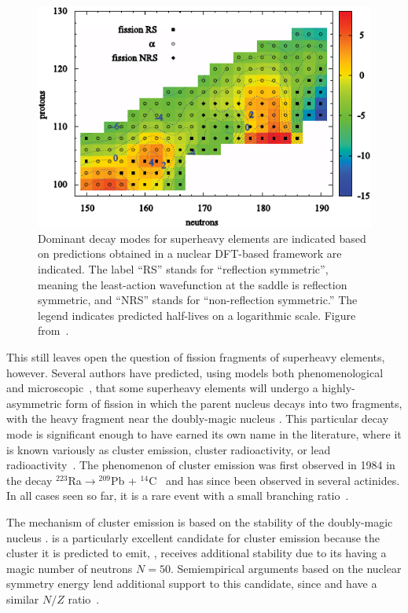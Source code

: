 \begin{figure}
	\centering
	\includegraphics[width=0.7\linewidth]{TeX_files/294Og_Warda2012_SHE}
	\caption[Dominant decay modes for superheavy elements are indicated based on predictions obtained in a nuclear DFT-based framework.]{Dominant decay modes for superheavy elements are indicated based on predictions obtained in a nuclear DFT-based framework are indicated. The label ``RS'' stands for ``reflection symmetric'', meaning the least-action wavefunction at the saddle is reflection symmetric, and ``NRS'' stands for ``non-reflection symmetric.'' The legend indicates predicted half-lives on a logarithmic scale. Figure from~\cite{Warda2012}.}
	\label{fig:warda2012she}
\end{figure}

This still leaves open the question of fission fragments of superheavy elements, however. Several authors have predicted, using models both phenomenological~\cite{Poenaru2011, Poenaru2012, Poenaru2013, Poenaru2015, Poenaru2018,Santhosh2018, Zhang2018} and microscopic~\cite{Warda2018}, that some superheavy elements will undergo a highly-asymmetric form of fission in which the parent nucleus decays into two fragments, with the heavy fragment near the doubly-magic nucleus {\Pb}. This particular decay mode is significant enough to have earned its own name in the literature, where it is known variously as cluster emission, cluster radioactivity, or lead radioactivity~\cite{Sandulescu1980,Poenaru1986,Royer1998,Poenaru2010,Warda2011}. The phenomenon of cluster emission was first observed in 1984 in the decay $^{223}$Ra$\rightarrow$$^{209}$Pb + $^{14}$C~\cite{Rose1984} and has since been observed in several actinides. In all cases seen so far, it is a rare event with a small branching ratio~\cite{Poenaru2010}.

The mechanism of cluster emission is based on the stability of the doubly-magic nucleus {\Pb}. {\Og} is a particularly excellent candidate for cluster emission because the cluster it is predicted to emit, {\Kr}, receives additional stability due to its having a magic number of neutrons $N=50$.  Semiempirical arguments based on the nuclear symmetry energy lend additional support to this candidate, since {\Og} and {\Pb} have a similar $N/Z$ ratio~\cite{Warda2018}.

